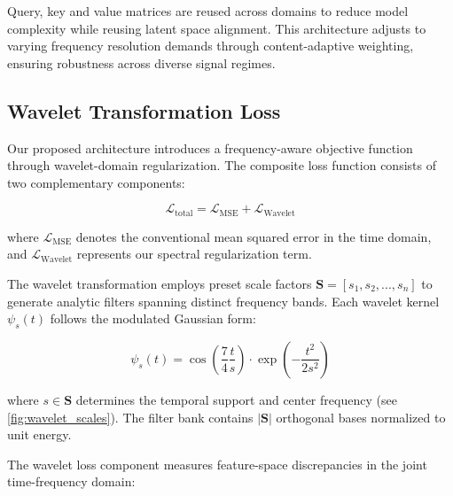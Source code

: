 \documentclass[12pt]{article}
\begin{document}


Query, key and value matrices are reused across domains to reduce model complexity while reusing latent space alignment. This architecture adjusts to varying frequency resolution demands through content-adaptive weighting, ensuring robustness across diverse signal regimes.


\subsection{Wavelet Transformation Loss}

Our proposed architecture introduces a frequency-aware objective function through wavelet-domain regularization. The composite loss function consists of two complementary components:

\begin{equation}
    \mathcal{L}_{\text{total}} = \mathcal{L}_{\text{MSE}} + \mathcal{L}_{\text{Wavelet}}
    \label{eq:combined_loss}
\end{equation}

where $\mathcal{L}_{\text{MSE}}$ denotes the conventional mean squared error in the time domain, and $\mathcal{L}_{\text{Wavelet}}$ represents our spectral regularization term.


The wavelet transformation employs preset scale factors $\mathbf{S} = [s_1, s_2, ..., s_n]$ to generate analytic filters spanning distinct frequency bands. Each wavelet kernel $\psi_s(t)$ follows the modulated Gaussian form:

\begin{equation}
    \psi_s(t) = \cos\left(\frac{7}{4}\frac{t}{s}\right) \cdot \exp\left(-\frac{t^2}{2s^2}\right)
    \label{eq:wavelet_def}
\end{equation}

where $s \in \mathbf{S}$ determines the temporal support and center frequency (see \autoref{fig:wavelet_scales}). The filter bank contains $|\mathbf{S}|$ orthogonal bases normalized to unit energy.


The wavelet loss component measures feature-space discrepancies in the joint time-frequency domain:
\end{document}
